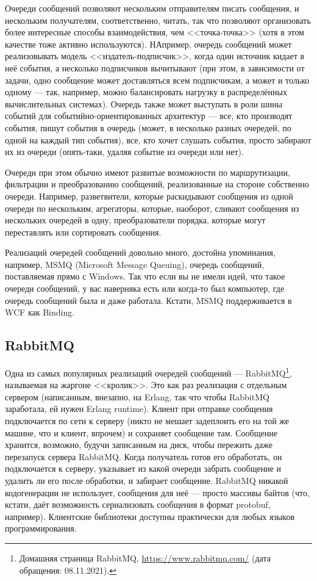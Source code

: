 \documentclass[a5paper]{article}
\begin{document}
Очереди сообщений позволяют нескольким отправителям писать сообщения, и нескольким получателям, соответственно, читать, так что позволяют организовать более интересные способы взаимодействия, чем <<точка-точка>> (хотя в этом качестве тоже активно используются). НАпример, очередь сообщений может реализовывать модель <<издатель-подписчик>>, когда один источник кидает в неё события, а несколько подписчиков вычитывают (при этом, в зависимости от задачи, одно сообщение может доставляться всем подписчикам, а может и только одному --- так, например, можно балансировать нагрузку в распределённых вычислительных системах). Очередь также может выступать в роли шины событий для событийно-ориентированных архитектур --- все, кто производят события, пишут события в очередь (может, в несколько разных очередей, по одной на каждый тип события), все, кто хочет слушать события, просто забирают их из очереди (опять-таки, удаляя событие из очереди или нет).

Очереди при этом обычно имеют развитые возможности по маршрутизации, фильтрации и преобразованию сообщений, реализованные на стороне собственно очереди. Например, разветвители, которые раскидывают сообщения из одной очереди по нескольким, агрегаторы, которые, наоборот, сливают сообщения из нескольких очередей в одну, преобразователи порядка, которые могут переставлять или сортировать сообщения.

Реализаций очередей сообщений довольно много, достойна упоминания, например, MSMQ (Microsoft Message Queuing), очередь сообщений, поставляемая прямо с Windows. Так что если вы не имели идей, что такое очереди сообщений, у вас наверняка есть или когда-то был компьютер, где очередь сообщений была и даже работала. Кстати, MSMQ поддерживается в WCF как Binding.

\subsection{RabbitMQ}

Одна из самых популярных реализаций очередей сообщений --- RabbitMQ\footnote{Домашняя страница RabbitMQ, \url{https://www.rabbitmq.com/} (дата обращения: 08.11.2021).}, называемая на жаргоне <<кролик>>. Это как раз реализация с отдельным сервером (написанным, внезапно, на Erlang, так что чтобы RabbitMQ заработала, ей нужен Erlang runtime). Клиент при отправке сообщения подключается по сети к серверу (никто не мешает задеплоить его на той же машине, что и клиент, впрочем) и сохраняет сообщение там. Сообщение хранится, возможно, будучи записанным на диск, чтобы пережить даже перезапуск сервера RabbitMQ. Когда получатель готов его обработать, он подключается к серверу, указывает из какой очереди забрать сообщение и удалить ли его после обработки, и забирает сообщение. RabbitMQ никакой кодогенерации не использует, сообщения для неё --- просто массивы байтов (что, кстати, даёт возможность сериализовать сообщения в формат protobuf, например). Клиентские библиотеки доступны практически для любых языков программирования.
\end{document}
